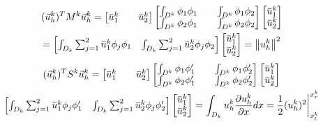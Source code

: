 \documentclass{article}
\newcommand{\norm}[1]{\left\lVert#1\right\rVert}
\newcommand{\overbar}[1]{\mkern 1.5mu\overline{\mkern-1.5mu#1\mkern-1.5mu}\mkern 1.5mu}
\begin{document}
\begin{gather*}
  (\vec{u}_h^k)^T M^k \vec{u}_h^k =
  \begin{bmatrix}
    \overbar{u}_1^k && \overbar{u}_2^k \\
  \end{bmatrix}
  \begin{bmatrix}
    \int_{D^k} \phi_1 \phi_1 &&  \int_{D^k} \phi_1 \phi_2\\
    \int_{D^k} \phi_2 \phi_1 &&  \int_{D^k} \phi_2 \phi_2\\
  \end{bmatrix}
  \begin{bmatrix}
    \overbar{u}_1^k\\
    \overbar{u}_2^k \\
  \end{bmatrix}\\
  = \begin{bmatrix}
  \int_{D_k} \sum_{j=1}^2 \overbar{u}_1^k \phi_j \phi_1 &
  \int_{D_k} \sum_{j=1}^2 \overbar{u}_2^k \phi_j \phi_2 \\
  \end{bmatrix}
  \begin{bmatrix}
    \overbar{u}_1^k\\
    \overbar{u}_2^k \\
  \end{bmatrix}
  =  \norm{u_h^k}^2 \\
\end{gather*}
\begin{gather*}
  (\vec{u}_h^k)^T S^k \vec{u}_h^k =
    \begin{bmatrix}
    \overbar{u}_1^k && \overbar{u}_2^k \\
  \end{bmatrix}
  \begin{bmatrix}
    \int_{D^k} \phi_1 \phi_1^{\prime} &&  \int_{D^k} \phi_1 \phi_2^{\prime} \\
    \int_{D^k} \phi_2 \phi_1^{\prime} &&  \int_{D^k} \phi_2 \phi_2^{\prime}\\
  \end{bmatrix}
  \begin{bmatrix}
    \overbar{u}_1^k\\
    \overbar{u}_2^k \\
  \end{bmatrix}\\
  \begin{bmatrix}
  \int_{D_k} \sum_{j=1}^2 \overbar{u}_1^k \phi_j \phi_1^{\prime} &
  \int_{D_k} \sum_{j=1}^2 \overbar{u}_2^k \phi_j \phi_2^{\prime} \\
  \end{bmatrix}
  \begin{bmatrix}
    \overbar{u}_1^k\\
    \overbar{u}_2^k \\
  \end{bmatrix}
   = \int_{D_k} u_h^k\frac{\partial u_h^k}{\partial x} dx = \frac{1}{2} (u_h^k)^2\biggr\rvert_{x_l^k}^{x^k_r}
\end{gather*}
\end{document}
